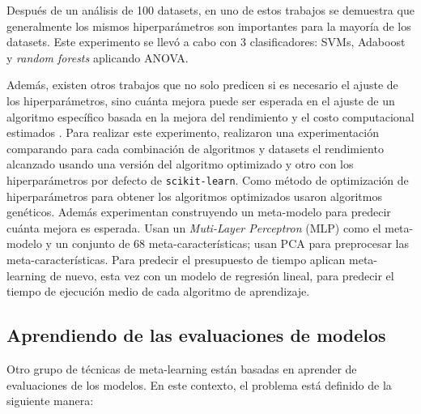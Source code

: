 Después de un análisis de 100 datasets, en uno de estos trabajos \cite{ridd2014using} se demuestra que generalmente los mismos hiperparámetros son importantes para la mayoría de los datasets. Este experimento se llevó a cabo con 3 clasificadores: SVMs, Adaboost y \textit{random forests} aplicando ANOVA.

Además, existen otros trabajos que no solo predicen si es necesario el ajuste de los hiperparámetros, sino cuánta mejora puede ser esperada en el ajuste de un algoritmo específico basada en la mejora del rendimiento y el costo computacional estimados \cite{sanders2017informing}. Para realizar este experimento, realizaron una experimentación comparando para cada combinación de algoritmos y datasets el rendimiento alcanzado usando una versión del algoritmo optimizado y otro con los hiperparámetros por defecto de \texttt{scikit-learn}. Como método de optimización de hiperparámetros para obtener los algoritmos optimizados usaron algoritmos genéticos. Además experimentan construyendo un meta-modelo para predecir cuánta mejora es esperada. Usan un \textit{Muti-Layer Perceptron} (MLP) como el meta-modelo y un conjunto de 68 meta-características; usan PCA para preprocesar las meta-características. Para predecir el presupuesto de tiempo aplican meta-learning de nuevo, esta vez con un modelo de regresión lineal, para predecir el tiempo de ejecución medio de cada algoritmo de aprendizaje.


%

\subsection{Aprendiendo de las evaluaciones de modelos}\label{subsec:mtl_automl_evaluations}

Otro grupo de técnicas de meta-learning están basadas en aprender de evaluaciones de los modelos. En este contexto, el problema está definido de la siguiente manera:

